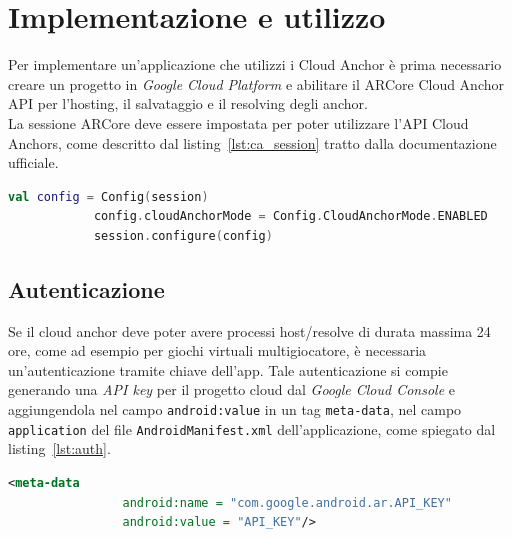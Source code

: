 \documentclass[crop=false, class=book]{standalone}
\begin{document}
	\section{Implementazione e utilizzo}
	Per implementare un'applicazione che utilizzi i Cloud Anchor è prima necessario creare un progetto in \textit{Google Cloud Platform} e abilitare il ARCore Cloud Anchor API per l'hosting, il salvataggio e il resolving degli anchor.
	\\
	\noindent
	La sessione ARCore deve essere impostata per poter utilizzare l'API Cloud Anchors, come descritto dal listing~\vref{lst:ca_session} tratto dalla documentazione ufficiale.
	\begin{center}
		\begin{minipage}{0.95\textwidth}
			\begin{lstlisting}[caption={Configurazione della modalità Cloud Anchor.}, label={lst:ca_session}, language=Kotlin]
			val config = Config(session)
			config.cloudAnchorMode = Config.CloudAnchorMode.ENABLED
			session.configure(config)
			\end{lstlisting}
		\end{minipage}
	\end{center}

	\subsection*{Autenticazione}
	Se il cloud anchor deve poter avere processi host/resolve di durata massima 24 ore, come ad esempio per giochi virtuali multigiocatore, è necessaria un'autenticazione tramite chiave dell'app. Tale autenticazione si compie generando una \textit{API key} per il progetto cloud dal \textit{Google Cloud Console} e aggiungendola nel campo \verb|android:value| in un tag \verb|meta-data|, nel campo \verb|application| del file \verb|AndroidManifest.xml| dell'applicazione, come spiegato dal listing~\vref{lst:auth}.
	\begin{center}
		\begin{minipage}{0.95\textwidth}
			\begin{lstlisting}[caption={Autenticazione con API key.}, label={lst:auth}, language=xml, morekeywords={android:name, android:value}, keywordstyle={\color{NavyBlue}\bfseries}, alsodigit={-}, stringstyle={\color{ForestGreen}\ttfamily}, emph={meta-data},emphstyle={\color{OrangeRed}}]
			<meta-data
				android:name = "com.google.android.ar.API_KEY"
				android:value = "API_KEY"/>
			\end{lstlisting}
		\end{minipage}
	\end{center}
\end{document}
